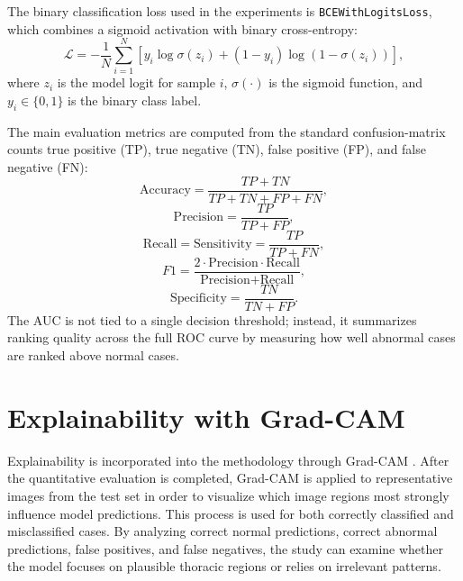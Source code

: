 The binary classification loss used in the experiments is \texttt{BCEWithLogitsLoss}, which combines a sigmoid activation with binary cross-entropy:
\begin{equation}
\mathcal{L} = -\frac{1}{N}\sum_{i=1}^{N} \left[y_i \log \sigma(z_i) + (1-y_i)\log \left(1-\sigma(z_i)\right)\right],
\end{equation}
where $z_i$ is the model logit for sample $i$, $\sigma(\cdot)$ is the sigmoid function, and $y_i \in \{0,1\}$ is the binary class label.

The main evaluation metrics are computed from the standard confusion-matrix counts true positive (TP), true negative (TN), false positive (FP), and false negative (FN):
\begin{equation}
\text{Accuracy} = \frac{TP + TN}{TP + TN + FP + FN},
\end{equation}
\begin{equation}
\text{Precision} = \frac{TP}{TP + FP},
\end{equation}
\begin{equation}
\text{Recall} = \text{Sensitivity} = \frac{TP}{TP + FN},
\end{equation}
\begin{equation}
F1 = \frac{2 \cdot \text{Precision} \cdot \text{Recall}}{\text{Precision} + \text{Recall}},
\end{equation}
\begin{equation}
\text{Specificity} = \frac{TN}{TN + FP}.
\end{equation}
The AUC is not tied to a single decision threshold; instead, it summarizes ranking quality across the full ROC curve by measuring how well abnormal cases are ranked above normal cases.

\section{Explainability with Grad-CAM}
Explainability is incorporated into the methodology through Grad-CAM \cite{ref:selvaraju2017}. After the quantitative evaluation is completed, Grad-CAM is applied to representative images from the test set in order to visualize which image regions most strongly influence model predictions. This process is used for both correctly classified and misclassified cases. By analyzing correct normal predictions, correct abnormal predictions, false positives, and false negatives, the study can examine whether the model focuses on plausible thoracic regions or relies on irrelevant patterns.

